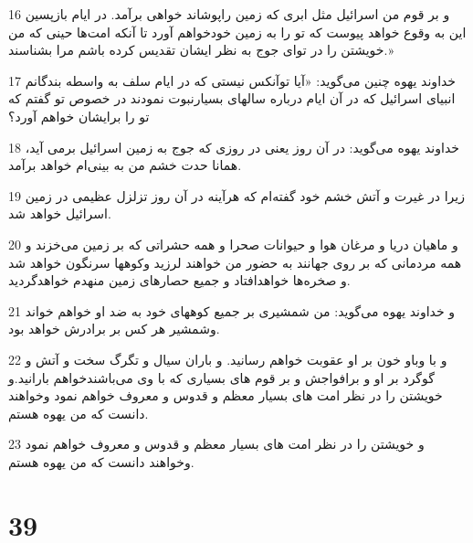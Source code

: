 \par 16 و بر قوم من اسرائیل مثل ابری که زمین راپوشاند خواهی برآمد. در ایام بازپسین این به وقوع خواهد پیوست که تو را به زمین خودخواهم آورد تا آنکه امت‌ها حینی که من خویشتن را در تو‌ای جوج به نظر ایشان تقدیس کرده باشم مرا بشناسند.»
\par 17 خداوند یهوه چنین می‌گوید: «آیا توآنکس نیستی که در ایام سلف به واسطه بندگانم انبیای اسرائیل که در آن ایام درباره سالهای بسیارنبوت نمودند در خصوص تو گفتم که تو را برایشان خواهم آورد؟
\par 18 خداوند یهوه می‌گوید: در آن روز یعنی در روزی که جوج به زمین اسرائیل برمی آید، همانا حدت خشم من به بینی‌ام خواهد برآمد.
\par 19 زیرا در غیرت و آتش خشم خود گفته‌ام که هرآینه در آن روز تزلزل عظیمی در زمین اسرائیل خواهد شد.
\par 20 و ماهیان دریا و مرغان هوا و حیوانات صحرا و همه حشراتی که بر زمین می‌خزند و همه مردمانی که بر روی جهانند به حضور من خواهند لرزید وکوهها سرنگون خواهد شد و صخره‌ها خواهدافتاد و جمیع حصارهای زمین منهدم خواهدگردید.
\par 21 و خداوند یهوه می‌گوید: من شمشیری بر جمیع کوههای خود به ضد او خواهم خواند وشمشیر هر کس بر برادرش خواهد بود.
\par 22 و با وباو خون بر او عقوبت خواهم رسانید. و باران سیال و تگرگ سخت و آتش و گوگرد بر او و برافواجش و بر قوم های بسیاری که با وی می‌باشندخواهم بارانید.و خویشتن را در نظر امت های بسیار معظم و قدوس و معروف خواهم نمود وخواهند دانست که من یهوه هستم.
\par 23 و خویشتن را در نظر امت های بسیار معظم و قدوس و معروف خواهم نمود وخواهند دانست که من یهوه هستم.

\chapter{39}

